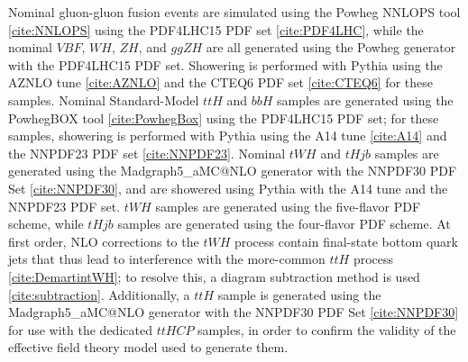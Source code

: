 \begin{table}[h!]
  \centering
  \caption{Summary of nominal signal samples}
  \label{tab:signal_samples_pyt}
\end{table}

Nominal gluon-gluon fusion events are simulated using the Powheg NNLOPS tool \ref{cite:NNLOPS} using the PDF4LHC15 PDF set \ref{cite:PDF4LHC}, while the nominal $VBF$, $WH$, $ZH$, and $ggZH$ are all generated using the Powheg generator with the PDF4LHC15 PDF set. Showering is performed with Pythia using the AZNLO tune \ref{cite:AZNLO} and the CTEQ6 PDF set \ref{cite:CTEQ6} for these samples. Nominal Standard-Model $ttH$ and $bbH$ samples are generated using the PowhegBOX tool \ref{cite:PowhegBox} using the PDF4LHC15 PDF set; for these samples, showering is performed with Pythia using the A14 tune \ref{cite:A14} and the NNPDF23 PDF set \ref{cite:NNPDF23}. Nominal $tWH$ and $tHjb$ samples are generated using the Madgraph5_aMC@NLO generator with the NNPDF30 PDF Set \ref{cite:NNPDF30}, and are showered using Pythia with the A14 tune and the NNPDF23 PDF set. $tWH$ samples are generated using the five-flavor PDF scheme, while $tHjb$ samples are generated using the four-flavor PDF scheme. At first order, NLO corrections to the $tWH$ process contain final-state bottom quark jets that thus lead to interference with the more-common $ttH$ process \ref{cite:DemartintWH}; to resolve this, a diagram subtraction method is used \ref{cite:subtraction}.
Additionally, a $ttH$ sample is generated using the Madgraph5_aMC@NLO generator with the NNPDF30 PDF Set \ref{cite:NNPDF30} for use with the dedicated $ttH CP$ samples, in order to confirm the validity of the effective field theory model used to generate them.

